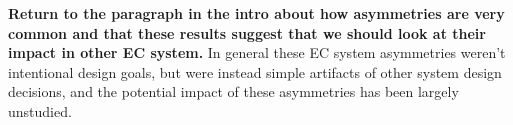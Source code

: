 \documentclass{sig-alternate}
\begin{document}
\textbf{Return to the paragraph in the intro about how asymmetries are very common and that these results suggest that we should look at their impact in other EC system.}
In general these 
EC system
asymmetries weren't intentional design goals, but were instead simple artifacts of other system design decisions, and 
the potential impact of these asymmetries has been largely unstudied.






\end{document}
